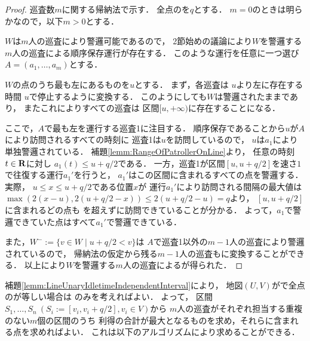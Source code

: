 \begin{proof}
  \newcommand{\leftmostpoint}{u}  %
  \newcommand{\leftmostpatroller}{巡査1}

  巡査数$m$に関する帰納法で示す．
  全点の{\maxIdletime}を$q$とする．
  $m = 0$のときは明らかなので，以下$m > 0$とする．

  $W$は$m$人の巡査により警邏可能であるので，
  2節始めの議論により$W$を警邏する$m$人の巡査による順序保存運行が存在する．
  このような運行を任意に一つ選び
  $A = (a_1, \ldots, a_m)$とする．

  $W$の点のうち最も左にあるものを$\leftmostpoint$とする．
  まず，各巡査は
  $\leftmostpoint$より左に存在する時間
  $\leftmostpoint$で停止するように変換する．
  このようにしても$W$は警邏されたままであり，
  またこれによりすべての巡査は
  区間$[\leftmostpoint, +\infty)$に存在することになる．

  ここで，$A$で最も左を運行する{\leftmostpatroller}に注目する．
  順序保存であることから$\leftmostpoint$が$A$により訪問されるすべての時刻に
  {\leftmostpatroller}は$\leftmostpoint$を訪問しているので，
  $\leftmostpoint$は$a_1$により単独警邏されている．
  補題\ref{lemm:RangeOfPatrollerOnLine}より，
  任意の時刻$t \in \mathbf R$に対し
  $a_1(t) \leq \leftmostpoint + q/2$である．
  一方，{\leftmostpatroller}が区間$[\leftmostpoint, \leftmostpoint + q/2]$を速さ$1$で往復する運行$a_1'$を行うと，
  $a_1'$はこの区間に含まれるすべての点を警邏する．
  実際，
  $\leftmostpoint \leq x \leq \leftmostpoint + q/2$である位置$x$が
  運行$a_1'$により訪問される間隔の最大値は
  $ \max( 2(x - \leftmostpoint), 2(\leftmostpoint + q/2 - x) )
    \leq 2(\leftmostpoint + q/2 - \leftmostpoint) = q$より，
    $[\leftmostpoint, \leftmostpoint + q/2]$に含まれるどの点も
  {\maxIdletime}を超えずに訪問できていることが分かる．
  よって，$a_1$で警邏できていた点はすべて$a_1'$で警邏できている．

  また，$W^- := \{ v \in W \mid \leftmostpoint + q/2 < v \}$は
  $A$で{\leftmostpatroller}以外の$m - 1$人の巡査により警邏されているので，
  帰納法の仮定から残る$m - 1$人の巡査も{\indSectOperation}に変換することができる．
  以上により$W$を警邏する$m$人の巡査による{\indSectOperation}が得られた．
\end{proof}


補題\ref{lemm:LineUnaryIdletimeIndependentInterval}により，
地図$(U, V)$が{\graphLine}で全点の{\maxIdletime}が等しい場合は
{\indSectOperation}のみを考えればよい．
よって，
区間$S_1, \ldots, S_n\ (S_i := [v_i, v_i + q/2], v_i \in V)$から
$m$人の巡査がそれぞれ担当する重複のない$m$個の区間のうち
利得の合計が最大となるものを求め，それらに含まれる点を求めればよい．
これは以下のアルゴリズムにより求めることができる．

